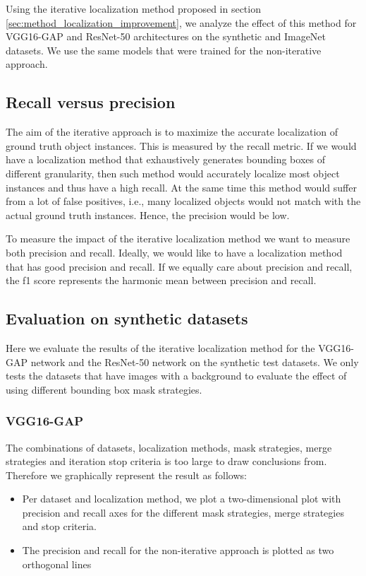 Using the iterative localization method proposed in section \ref{sec:method_localization_improvement}, we analyze the effect of this method for VGG16-GAP and ResNet-50 architectures on the synthetic and ImageNet datasets. We use the same models that were trained for the non-iterative approach.

\subsection{Recall versus precision}
The aim of the iterative approach is to maximize the accurate localization of ground truth object instances. This is measured by the recall metric. If we would have a localization method that exhaustively generates bounding boxes of different granularity, then such method would accurately localize most object instances and thus have a high recall. At the same time this method would suffer from a lot of false positives, i.e., many localized objects would not match with the actual ground truth instances. Hence, the precision would be low.

To measure the impact of the iterative localization method we want to measure both precision and recall. Ideally, we would like to have a localization method that has good precision and recall. If we equally care about precision and recall, the f1 score represents the harmonic mean between precision and recall.

\subsection{Evaluation on synthetic datasets}
Here we evaluate the results of the iterative localization method for the VGG16-GAP network and the ResNet-50 network on the synthetic test datasets. We only tests the datasets that have images with a background to evaluate the effect of using different bounding box mask strategies.

\subsubsection{VGG16-GAP}
The combinations of datasets, localization methods, mask strategies, merge strategies and iteration stop criteria is too large to draw conclusions from. Therefore we graphically represent the result as follows:
\begin{itemize}
    \item Per dataset and localization method, we plot a two-dimensional plot with precision and recall axes for the different mask strategies, merge strategies and stop criteria.
    \item The precision and recall for the non-iterative approach is plotted as two orthogonal lines
\end{itemize}

